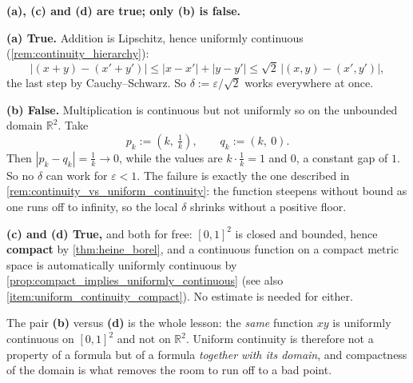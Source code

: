 \begin{exercisesolution}
\label{sol:uniform_continuity_multiple_choice}
\textbf{(a), (c) and (d) are true; only (b) is false.}

\textbf{(a) True.} Addition is Lipschitz, hence uniformly continuous
(\cref{rem:continuity_hierarchy}):
\[\big|(x+y)-(x'+y')\big| \leq |x-x'| + |y-y'| \leq \sqrt2\,\big|(x,y)-(x',y')\big|,\]
the last step by Cauchy--Schwarz. So $\delta := \varepsilon/\sqrt2$ works everywhere at once.

\textbf{(b) False.} Multiplication is continuous but not uniformly so on the unbounded domain
$\mathbb{R}^2$. Take
\[p_k := \left(k,\ \tfrac1k\right), \qquad q_k := \left(k,\ 0\right).\]
Then $|p_k - q_k| = \tfrac1k \to 0$, while the values are $k \cdot \tfrac1k = 1$ and
$0$, a constant gap of $1$. So no $\delta$ can work for $\varepsilon < 1$. The failure is exactly
the one described in \cref{rem:continuity_vs_uniform_continuity}: the function steepens without
bound as one runs off to infinity, so the local $\delta$ shrinks without a positive floor.

\textbf{(c) and (d) True,} and both for free: $[0,1]^2$ is closed and bounded, hence
\textbf{compact} by \cref{thm:heine_borel}, and a continuous function on a compact metric space
is automatically uniformly continuous by
\cref{prop:compact_implies_uniformly_continuous} (see also
\cref{item:uniform_continuity_compact}). No estimate is needed for either.

\begin{remark}
The pair \textbf{(b)} versus \textbf{(d)} is the whole lesson: the \emph{same} function $xy$ is
uniformly continuous on $[0,1]^2$ and not on $\mathbb{R}^2$. Uniform continuity is therefore not
a property of a formula but of a formula \emph{together with its domain}, and compactness of the
domain is what removes the room to run off to a bad point.
\end{remark}
\end{exercisesolution}

